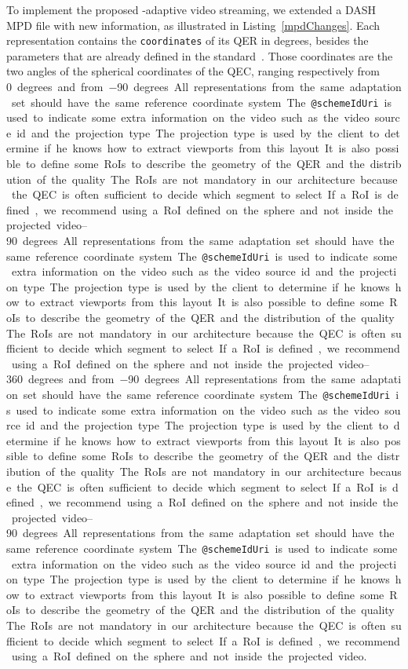  To implement the proposed
\FoV{}-adaptive video streaming, we extended a \ac{DASH} \ac{MPD}
file with new information, as illustrated in Listing~\ref{mpdChanges}.
Each representation contains the \texttt{coordinates} of its \ac{QER}
in degrees, besides the parameters that are
already defined in the standard~\cite{iso_iec}.
Those coordinates are the two angles of the spherical coordinates of the \ac{QEC}, ranging respectively from \SIrange{0}{360} degrees and from \SIrange{-90}{90} degrees. All representations from the same adaptation set should have the same reference coordinate system.
The \texttt{@schemeIdUri} is used to indicate some extra information on the video such as the video source id and the projection type. The projection type is used by the client to determine if he knows how to extract viewports from this layout.
It is also possible to define some \acp{RoI} to describe the geometry of the \ac{QER} and the distribution of the quality.
The \acp{RoI} are not mandatory in our architecture because the \ac{QEC} is often sufficient to decide which segment to select.
If a \ac{RoI} is defined, we recommend using a \ac{RoI} defined on the sphere and not inside the projected video.

